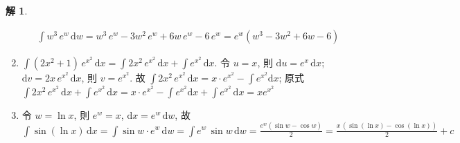 \documentclass[12pt]{extarticle}
\newcommand{\ds}{\displaystyle}
\theoremstyle{definition}
\newtheorem*{sol}{解}
\begin{document}
\begin{sol}
\begin{enumerate}
\begin{minipage}{0.15\textwidth}
  \end{minipage}
  \hspace{5mm}
  \begin{minipage}{0.8\textwidth}
    \begin{align*}
      \int w^3\,e^w\,\text{d}w = w^3\,e^w - 3w^2\,e^w + 6w\,e^w - 6\,e^w = e^w(w^3 - 3w^2 + 6w - 6)
    \end{align*}
  \end{minipage}
    \item $\ds\int(2x^2 + 1)\,e^{x^2}\,\text{d}x = \int\!2x^2\,e^{x^2}\,\text{d}x + \int\!e^{x^2}\,\text{d}x$. 令 $\ds u = x$, 則 $\ds\text{d}u = e^x\,\text{d}x$; $\ds\text{d}v = 2x\,e^{x^2}\,\text{d}x$, 則 $\ds v = e^{x^2}$. 故 $\ds\int\!2x^2\,e^{x^2}\,\text{d}x = x\cdot e^{x^2} - \int\!e^{x^2}\text{d}x$; 原式 $\ds\int\!2x^2\,e^{x^2}\,\text{d}x + \int\!e^{x^2}\,\text{d}x = x\cdot e^{x^2} - \int\!e^{x^2}\text{d}x + \int\!e^{x^2}\,\text{d}x = xe^{x^2}$
    \item 令 $\ds w = \ln x$, 則 $\ds e^w = x$, $\ds\text{d}x = e^w\,\text{d}w$, 故 $\ds\int\!\sin(\ln x)\,\text{d}x = \int\!\sin w\cdot e^w\,\text{d}w = \int e^w\,\sin w\,\text{d}w = \frac{e^w(\sin w - \cos w)}{2} = \frac{x\,(\sin(\ln x) - \cos(\ln x))}{2} + c$ \\

\end{enumerate}
\end{sol}
\end{document}
